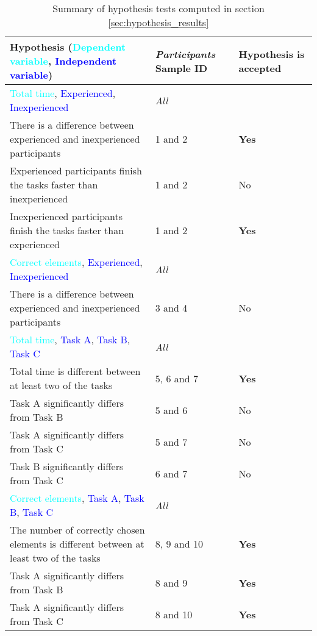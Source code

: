 	\begin{longtable}{p{}|p{}|p{}}  %
	\caption[Summary, hypothesis tests]{Summary of hypothesis tests computed in section \ref{sec:hypothesis_results}} \label{tab:hypothesistest_summary} \\
		Hypothesis (\textcolor{cyan}{Dependent variable}, \textcolor{blue}{Independent variable}) & \textit{Participants} Sample ID& Hypothesis is accepted \\[0.2cm] \hline
		\textcolor{cyan}{Total time}, \textcolor{blue}{Experienced}, \textcolor{blue}{Inexperienced} & \textit{All} &  \\
		There is a difference between experienced and inexperienced participants & 1 and 2 & \textbf{Yes} \\
		Experienced participants finish the tasks faster than inexperienced  & 1 and 2 & No   \\ 
		Inexperienced participants finish the tasks faster than experienced  & 1 and 2 & \textbf{Yes}   \\ \hline
		\textcolor{cyan}{Correct elements}, \textcolor{blue}{Experienced}, \textcolor{blue}{Inexperienced} & \textit{All} &  \\
		There is a difference between experienced and inexperienced participants & 3 and 4 & No   \\ \hline
		\textcolor{cyan}{Total time}, \textcolor{blue}{Task A}, \textcolor{blue}{Task B}, \textcolor{blue}{Task C}& \textit{All} &  \\
		 Total time is different between at least two of the tasks & 5, 6 and 7 & \textbf{Yes}   \\
		 Task A significantly differs from Task B & 5 and 6 & No  \\ 
		 Task A significantly differs from Task C & 5 and 7 & No  \\ 
		 Task B significantly differs from Task C & 6 and 7 & No  \\ \hline
		\textcolor{cyan}{Correct elements}, \textcolor{blue}{Task A}, \textcolor{blue}{Task B}, \textcolor{blue}{Task C} & \textit{All} &  \\
		The number of correctly chosen elements is different between at least two of the tasks & 8, 9 and 10 & \textbf{Yes}  \\
		Task A significantly differs from Task B & 8 and 9 & \textbf{Yes}  \\ 
		Task A significantly differs from Task C & 8 and 10 & \textbf{Yes}  \\ 

\end{longtable}
